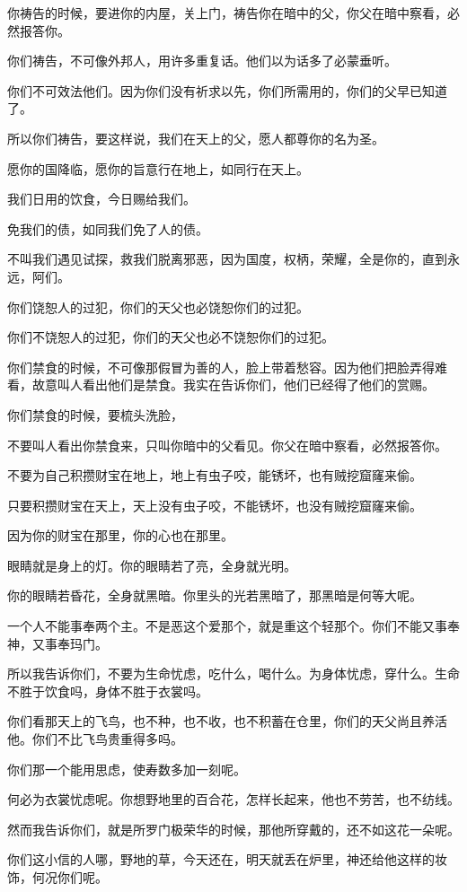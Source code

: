 \documentclass[12pt,oneside]{book}
\begin{document}
你祷告的时候，要进你的内屋，关上门，祷告你在暗中的父，你父在暗中察看，必然报答你。

你们祷告，不可像外邦人，用许多重复话。他们以为话多了必蒙垂听。

你们不可效法他们。因为你们没有祈求以先，你们所需用的，你们的父早已知道了。

所以你们祷告，要这样说，我们在天上的父，愿人都尊你的名为圣。

愿你的国降临，愿你的旨意行在地上，如同行在天上。

我们日用的饮食，今日赐给我们。

免我们的债，如同我们免了人的债。

不叫我们遇见试探，救我们脱离邪恶，因为国度，权柄，荣耀，全是你的，直到永远，阿们。

你们饶恕人的过犯，你们的天父也必饶恕你们的过犯。

你们不饶恕人的过犯，你们的天父也必不饶恕你们的过犯。

你们禁食的时候，不可像那假冒为善的人，脸上带着愁容。因为他们把脸弄得难看，故意叫人看出他们是禁食。我实在告诉你们，他们已经得了他们的赏赐。

你们禁食的时候，要梳头洗脸，

不要叫人看出你禁食来，只叫你暗中的父看见。你父在暗中察看，必然报答你。

不要为自己积攒财宝在地上，地上有虫子咬，能锈坏，也有贼挖窟窿来偷。

只要积攒财宝在天上，天上没有虫子咬，不能锈坏，也没有贼挖窟窿来偷。

因为你的财宝在那里，你的心也在那里。

眼睛就是身上的灯。你的眼睛若了亮，全身就光明。

你的眼睛若昏花，全身就黑暗。你里头的光若黑暗了，那黑暗是何等大呢。

一个人不能事奉两个主。不是恶这个爱那个，就是重这个轻那个。你们不能又事奉神，又事奉玛门。

所以我告诉你们，不要为生命忧虑，吃什么，喝什么。为身体忧虑，穿什么。生命不胜于饮食吗，身体不胜于衣裳吗。

你们看那天上的飞鸟，也不种，也不收，也不积蓄在仓里，你们的天父尚且养活他。你们不比飞鸟贵重得多吗。

你们那一个能用思虑，使寿数多加一刻呢。

何必为衣裳忧虑呢。你想野地里的百合花，怎样长起来，他也不劳苦，也不纺线。

然而我告诉你们，就是所罗门极荣华的时候，那他所穿戴的，还不如这花一朵呢。

你们这小信的人哪，野地的草，今天还在，明天就丢在炉里，神还给他这样的妆饰，何况你们呢。
\end{document}
